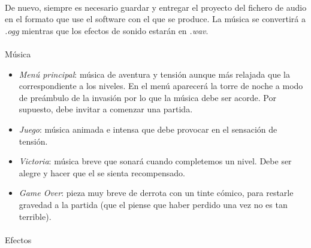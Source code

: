 \paragraph{}
De nuevo, siempre es necesario guardar y entregar el proyecto del fichero
de audio en el formato que use el software con el que se produce. La música
se convertirá a \emph{.ogg} mientras que los efectos de sonido estarán
en \emph{.wav}.

\paragraph{}
Música

\begin{itemize}
    \item \emph{Menú principal}: música de aventura y tensión aunque más
    relajada que la correspondiente a los niveles. En el menú aparecerá la torre de noche
    a modo de preámbulo de la invasión por lo que la música debe ser acorde.
    Por supuesto, debe invitar a comenzar una partida.
    \item \emph{Juego}: música animada e intensa que debe provocar en el
    \jugador sensación de tensión.
    \item \emph{Victoria}: música breve que sonará cuando completemos un nivel.
    Debe ser alegre y hacer que el \jugador se sienta recompensado.
    \item \emph{Game Over}: pieza muy breve de derrota con un tinte cómico,
    para restarle gravedad a la partida (que el \jugador piense que haber
    perdido una vez no es tan terrible).
\end{itemize}

\paragraph{}
Efectos

